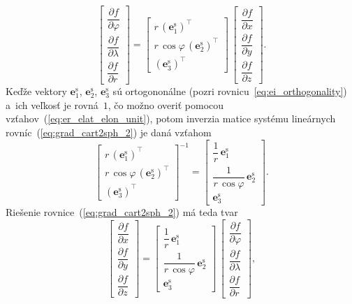 \documentclass[a4paper,12pt]{book}
\let\vec\mathbf
\begin{document}
\begin{equation}
\label{eq:grad_cart2sph_2}
\begin{bmatrix}
\dfrac{\partial f}{\partial \varphi}\\[2ex]
\dfrac{\partial f}{\partial \lambda}\\[2ex]
\dfrac{\partial f}{\partial r}
\end{bmatrix}
%
=
%
\begin{bmatrix}
r \, \left( \vec e^\mathrm{s}_1\right)^\top\\
r \, \cos\varphi \, \left(\vec e^\mathrm{s}_2\right)^\top\\
\left(\vec e^\mathrm{s}_3\right)^\top
\end{bmatrix}
%
\,
%
\begin{bmatrix}
\dfrac{\partial f}{\partial x}\\[2ex]
\dfrac{\partial f}{\partial y}\\[2ex]
\dfrac{\partial f}{\partial z}
\end{bmatrix}
%
{.}
\end{equation}
%
Keďže vektory $\vec e^\mathrm{s}_1$, $\vec e^\mathrm{s}_2$, $\vec 
e^\mathrm{s}_3$ sú ortogononálne (pozri rovnicu~\ref{eq:ei_orthogonality}) 
a~ich veľkosť je rovná~$1$, čo možno overiť pomocou 
vzťahov~(\ref{eq:er_elat_elon_unit}), potom inverzia matice systému lineárnych 
rovníc~(\ref{eq:grad_cart2sph_2}) je daná vzťahom \parencite{MichelLectures}
%
\begin{equation}
\begin{bmatrix}
r \, \left( \vec e^\mathrm{s}_1 \right)^\top\\[2ex]
r \, \cos\varphi \, \left( \vec e^\mathrm{s}_2 \right)^\top\\[2ex]
\left( \vec e^\mathrm{s}_3 \right)^\top
\end{bmatrix}^{-1}
%
=
%
\begin{bmatrix}
\dfrac{1}{r} \, \vec e^\mathrm{s}_1\\[2ex]
\dfrac{1}{r \, \cos\varphi} \, \vec e^\mathrm{s}_2\\[2ex]
\vec e^\mathrm{s}_3
\end{bmatrix}
{.}
\end{equation}
%
Riešenie rovnice~(\ref{eq:grad_cart2sph_2}) má teda tvar
%
\begin{equation}
\label{eq:grad_cart2sph_3}
\begin{bmatrix}
\dfrac{\partial f}{\partial x}\\[2ex]
\dfrac{\partial f}{\partial y}\\[2ex]
\dfrac{\partial f}{\partial z}
\end{bmatrix}
%
=
%
\begin{bmatrix}
\dfrac{1}{r} \, \vec e^\mathrm{s}_1\\[2ex]
\dfrac{1}{r \, \cos\varphi} \, \vec e^\mathrm{s}_2\\[2ex]
\vec e^\mathrm{s}_3
\end{bmatrix}
%
\,
%
\begin{bmatrix}
\dfrac{\partial f}{\partial \varphi}\\[2ex]
\dfrac{\partial f}{\partial \lambda}\\[2ex]
\dfrac{\partial f}{\partial r}
\end{bmatrix}
%
{,}
\end{equation}
\end{document}
